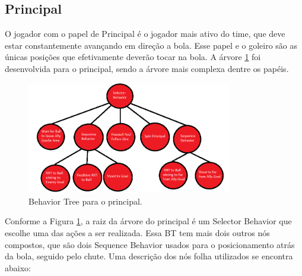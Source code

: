 \documentclass[conference]{IEEEtran}
\begin{document}
\subsection{Principal}

O jogador com o papel de Principal é o jogador mais ativo do time, que deve estar constantemente avançando em direção a bola. Esse papel e o goleiro são as únicas posições que efetivamente deverão tocar na bola. A árvore \ref{fig:principal_bt} foi desenvolvida para o principal, sendo a árvore mais complexa dentre os papéis.

\begin{figure}[H]
	\centering
	\includegraphics[width=0.8\textwidth]{figures/Principal_BT.png}
   	\caption{Behavior Tree para o principal.} \label{fig:principal_bt}
\end{figure}   

Conforme a Figura \ref{fig:principal_bt}, a raiz da árvore do principal é um Selector Behavior que escolhe uma das ações a ser realizada. Essa BT tem mais dois outros nós compostos, que são dois Sequence Behavior usados para o posicionamento atrás da bola, seguido pelo chute. Uma descrição dos nós folha utilizados se encontra abaixo:
\end{document}
